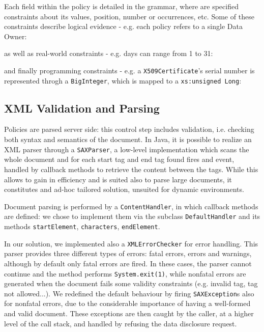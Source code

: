 Each field within the policy is detailed in the grammar, where are specified constraints about its values, position, number or occurrences, etc. Some of these constraints describe logical evidence - e.g. each policy refers to a single Data Owner:

as well as real-world constraints - e.g. days can range from 1 to 31:

and finally programming constraints - e.g. a \texttt{X509Certificate}'s serial number is represented throgh a \texttt{BigInteger}, which is mapped to a \texttt{xs:unsigned Long}:


\subsection{XML Validation and Parsing}
Policies are parsed server side: this control step includes validation, i.e. checking both syntax and semantics of the document. In Java, it is possible to realize an XML parser through a \texttt{SAXParser}, a low-level implementation which scans the whole document and for each start tag and end tag found fires and event, handled by callback methods to retrieve the content between the tags. While this allows to gain in efficiency and is suited also to parse large documents, it constitutes and ad-hoc tailored solution, unsuited for dynamic environments.

Document parsing is performed by a \texttt{ContentHandler}, in which callback methods are defined: we chose to implement them via the subclass \texttt{DefaultHandler} and its methods \texttt{startElement}, \texttt{characters}, \texttt{endElement}.

In our solution, we implemented also a \texttt{XMLErrorChecker} for error handling. This parser provides three different types of errors: fatal errors, errors and warnings, although by default only fatal errors are fired. In these cases, the parser cannot continue and the method performs \texttt{System.exit(1)}, while nonfatal errors are generated when the document fails some validity constraints (e.g. invalid tag, tag not allowed...). We redefined the default behaviour by firing \texttt{SAXException}s also for nonfatal errors, due to the considerable importance of having a well-formed and valid document. These exceptions are then caught by the caller, at a higher level of the call stack, and handled by refusing the data disclosure request.

